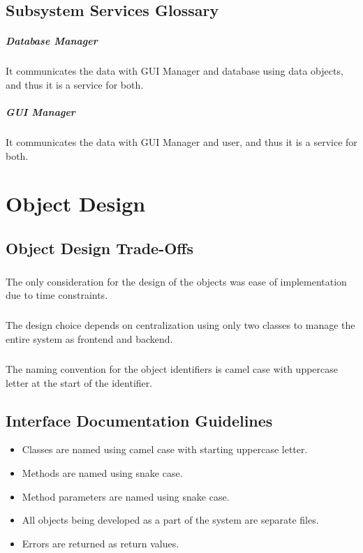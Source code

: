 \documentclass[a4paper,12pt]{report}
\begin{document}
		\section{Subsystem Services Glossary}
			\paragraph{Database Manager} It communicates the data with GUI Manager and database using data objects, and thus it is a service for both.
			\paragraph{GUI Manager} It communicates the data with GUI Manager and user, and thus it is a service for both.
	\chapter{Object Design}
		\section{Object Design Trade-Offs}
			\paragraph{} The only consideration for the design of the objects was ease of implementation due to time constraints.
			\paragraph{} The design choice depends on centralization using only two classes to manage the entire system as frontend and backend.
			\paragraph{} The naming convention for the object identifiers is camel case with uppercase letter at the start of the identifier.
		\section{Interface Documentation Guidelines}
			\begin{itemize}
				\item Classes are named using camel case with starting uppercase letter.
				\item Methods are named using snake case.
				\item Method parameters are named using snake case.
				\item All objects being developed as a part of the system are separate files.
				\item Errors are returned as return values.
			\end{itemize} 
		\vspace{100cm}
\end{document}
